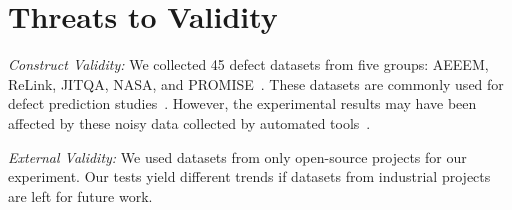 \section{ Threats to Validity}
\label{subsecThreatstoValidity}
\emph{Construct Validity: }
We collected 45 defect datasets from five groups: AEEEM, ReLink, JIT\textunderscore QA, NASA, and PROMISE~\cite{DAmbros2012EMSEbenchmark, Wu2011FSEReLink, Kamei2013TSEjit, ghotra2017msr}. 
These datasets are commonly used for defect prediction studies~\cite{Nam2013ICSEtransfer, Yang2016FSEunsupervised}. %
However, the experimental results may have been affected by these noisy data collected by automated tools~\cite{DAmbros2012EMSEbenchmark, Wu2011FSEReLink, Kamei2013TSEjit}.

\emph{External Validity: }
We used datasets from only open-source projects for our experiment. Our tests yield different trends if datasets from industrial projects are left for future work.

